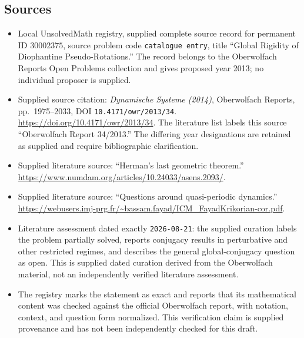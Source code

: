 \documentclass[11pt]{article}
\begin{document}
\subsection{Sources}
\begin{itemize}
\item Local UnsolvedMath registry, supplied complete source record for permanent ID \(30002375\), source problem code \texttt{catalogue entry}, title ``Global Rigidity of Diophantine Pseudo-Rotations.'' The record belongs to the Oberwolfach Reports Open Problems collection and gives proposed year 2013; no individual proposer is supplied.
\item Supplied source citation: \emph{Dynamische Systeme (2014)}, Oberwolfach Reports, pp.\ 1975--2033, DOI \texttt{10.4171/owr/2013/34}. \url{https://doi.org/10.4171/owr/2013/34}. The literature list labels this source ``Oberwolfach Report 34/2013.'' The differing year designations are retained as supplied and require bibliographic clarification.
\item Supplied literature source: ``Herman's last geometric theorem.'' \url{https://www.numdam.org/articles/10.24033/asens.2093/}.
\item Supplied literature source: ``Questions around quasi-periodic dynamics.'' \url{https://webusers.imj-prg.fr/~bassam.fayad/ICM_FayadKrikorian-cor.pdf}.
\item Literature assessment dated exactly \texttt{2026-08-21}: the supplied curation labels the problem partially solved, reports conjugacy results in perturbative and other restricted regimes, and describes the general global-conjugacy question as open. This is supplied dated curation derived from the Oberwolfach material, not an independently verified literature assessment.
\item The registry marks the statement as exact and reports that its mathematical content was checked against the official Oberwolfach report, with notation, context, and question form normalized. This verification claim is supplied provenance and has not been independently checked for this draft.
\end{itemize}
\end{document}
